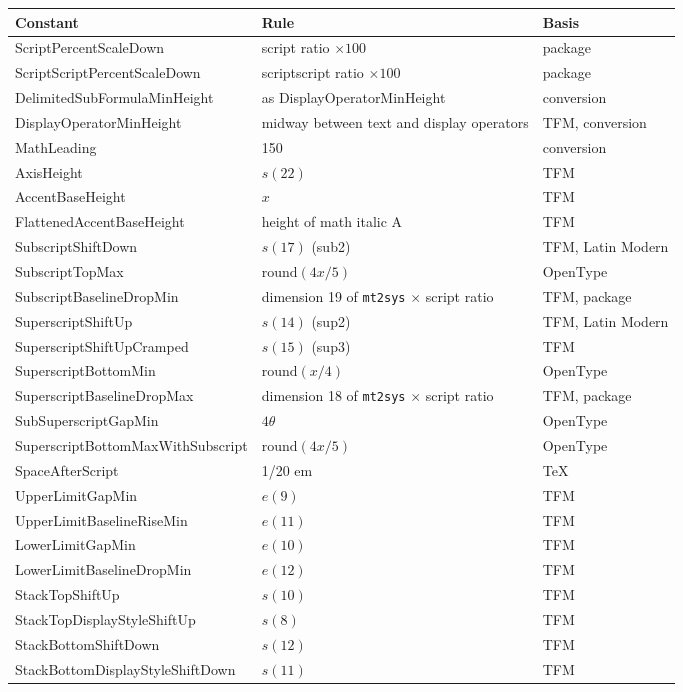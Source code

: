 \documentclass[10pt]{article}
\newcommand\file[1]{\texttt{#1}}
\begin{document}
\begin{longtable}{>{\raggedright\arraybackslash}p{}ll}
\toprule
Constant & Rule & Basis \\
\midrule
\endhead
ScriptPercentScaleDown & script ratio $\times100$ & package \\
ScriptScriptPercentScaleDown & scriptscript ratio $\times100$ & package \\
DelimitedSubFormulaMinHeight & as DisplayOperatorMinHeight & conversion \\
DisplayOperatorMinHeight & midway between text and display operators & TFM,
conversion \\
MathLeading & 150 & conversion \\
AxisHeight & $s(22)$ & TFM \\
AccentBaseHeight & $x$ & TFM \\
FlattenedAccentBaseHeight & height of math italic A & TFM \\
SubscriptShiftDown & $s(17)$ (sub2) & TFM, Latin Modern \\
SubscriptTopMax & $\mathrm{round}(4x/5)$ & OpenType \\
SubscriptBaselineDropMin & dimension 19 of \file{mt2sys} $\times$ script ratio
& TFM, package \\
SuperscriptShiftUp & $s(14)$ (sup2) & TFM, Latin Modern \\
SuperscriptShiftUpCramped & $s(15)$ (sup3) & TFM \\
SuperscriptBottomMin & $\mathrm{round}(x/4)$ & OpenType \\
SuperscriptBaselineDropMax & dimension 18 of \file{mt2sys} $\times$ script
ratio & TFM, package \\
SubSuperscriptGapMin & $4\theta$ & OpenType \\
SuperscriptBottomMaxWithSubscript & $\mathrm{round}(4x/5)$ & OpenType \\
SpaceAfterScript & 1/20 em & \TeX \\
UpperLimitGapMin & $e(9)$ & TFM \\
UpperLimitBaselineRiseMin & $e(11)$ & TFM \\
LowerLimitGapMin & $e(10)$ & TFM \\
LowerLimitBaselineDropMin & $e(12)$ & TFM \\
StackTopShiftUp & $s(10)$ & TFM \\
StackTopDisplayStyleShiftUp & $s(8)$ & TFM \\
StackBottomShiftDown & $s(12)$ & TFM \\
StackBottomDisplayStyleShiftDown & $s(11)$ & TFM \\

\end{longtable}
\end{document}

